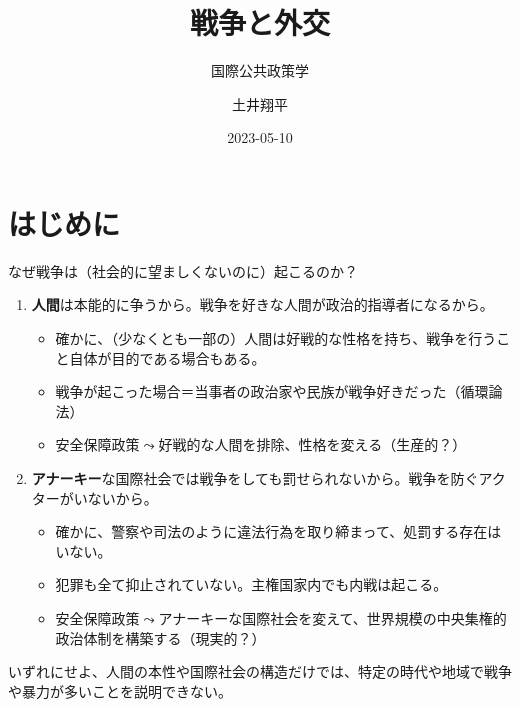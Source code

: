 \documentclass[
  xelatex,
  ja=standard]{bxjsarticle}
\title{戦争と外交}
\subtitle{国際公共政策学}
\author{土井翔平}
\date{2023-05-10}
\providecommand{\tightlist}{%
  \setlength{\itemsep}{0pt}\setlength{\parskip}{0pt}}\usepackage{longtable,booktabs,array}
\begin{document}
\maketitle
\ifdefined\Shaded\renewenvironment{Shaded}{\begin{tcolorbox}[sharp corners, boxrule=0pt, breakable, interior hidden, borderline west={3pt}{0pt}{shadecolor}, enhanced, frame hidden]}{\end{tcolorbox}}\fi

\hypertarget{ux306fux3058ux3081ux306b}{%
\section*{はじめに}\label{ux306fux3058ux3081ux306b}}

なぜ戦争は（社会的に望ましくないのに）起こるのか？

\begin{enumerate}
\def\labelenumi{\arabic{enumi}.}
\tightlist
\item
  \textbf{⼈間}は本能的に争うから。戦争を好きな⼈間が政治的指導者になるから。

  \begin{itemize}
  \tightlist
  \item
    確かに、（少なくとも一部の）人間は好戦的な性格を持ち、戦争を行うこと自体が目的である場合もある。
  \item
    戦争が起こった場合＝当事者の政治家や⺠族が戦争好きだった（循環論法）
  \item
    安全保障政策\(\leadsto\)好戦的な人間を排除、性格を変える（生産的？）
  \end{itemize}
\item
  \textbf{アナーキー}な国際社会では戦争をしても罰せられないから。戦争を防ぐアクターがいないから。

  \begin{itemize}
  \tightlist
  \item
    確かに、警察や司法のように違法行為を取り締まって、処罰する存在はいない。
  \item
    犯罪も全て抑止されていない。主権国家内でも内戦は起こる。
  \item
    安全保障政策\(\leadsto\)アナーキーな国際社会を変えて、世界規模の中央集権的政治体制を構築する（現実的？）
  \end{itemize}
\end{enumerate}

いずれにせよ、人間の本性や国際社会の構造だけでは、特定の時代や地域で戦争や暴力が多いことを説明できない。
\end{document}

